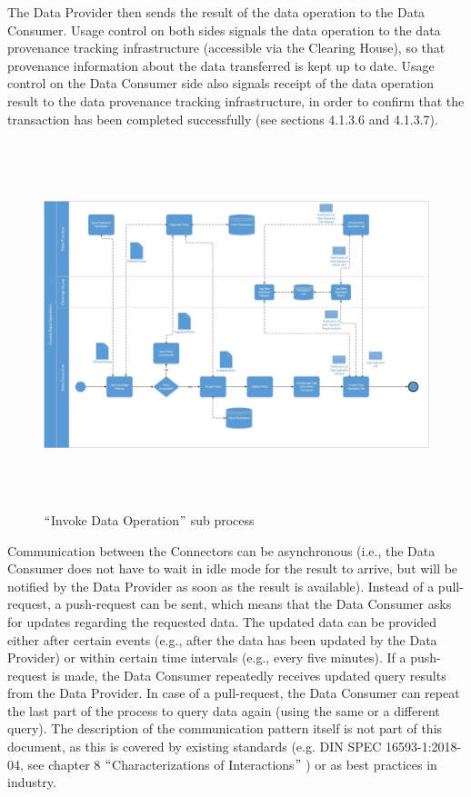 The Data Provider then sends the result of the data operation to the Data Consumer. Usage control on both sides signals the data operation to the data provenance tracking infrastructure (accessible via the Clearing House), so that provenance information about the data transferred is kept up to date. Usage control on the Data Consumer side also signals receipt of the data operation result to the data provenance tracking infrastructure, in order to confirm that the transaction has been completed successfully (see sections 4.1.3.6 and 4.1.3.7). 



\begin{figure}[H]
	\begin{Center}
		\includegraphics[width=6.53in,height=4.2in]{./media/image28.jpeg}
		\caption{$``$Invoke Data Operation$"$  sub process	}
		\label{fig:invole_data_operation}
	\end{Center}
\end{figure}



Communication between the Connectors can be asynchronous (i.e., the Data Consumer does not have to wait in idle mode for the result to arrive, but will be notified by the Data Provider as soon as the result is available). Instead of a pull-request, a push-request can be sent, which means that the Data Consumer asks for updates regarding the requested data. The updated data can be provided either after certain events (e.g., after the data has been updated by the Data Provider) or within certain time intervals (e.g., every five minutes). If a push-request is made, the Data Consumer repeatedly receives updated query results from the Data Provider. In case of a pull-request, the Data Consumer can repeat the last part of the process to query data again (using the same or a different query). The description of the communication pattern itself is not part of this document, as this is covered by existing standards (e.g. DIN SPEC 16593-1:2018-04, see chapter 8 $``$Characterizations of Interactions$"$ ) or as best practices in industry. 
		


